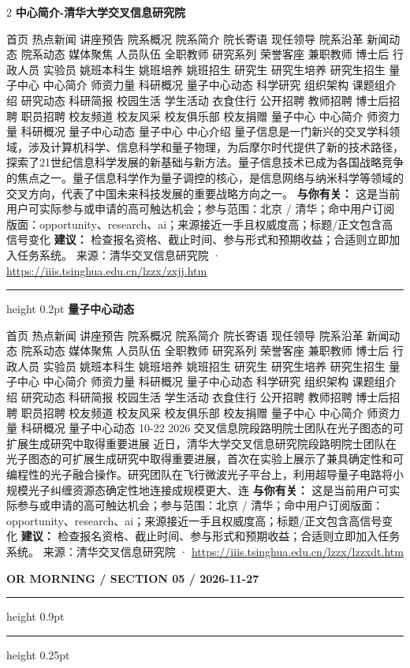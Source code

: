 \documentclass[10.5pt]{ctexart}
\begin{document}
\begin{multicols}{2}
{\large\bfseries 中心简介-清华大学交叉信息研究院}\par
首页 热点新闻 讲座预告 院系概况 院系简介 院长寄语 现任领导 院系沿革 新闻动态 院系动态 媒体聚焦 人员队伍 全职教师 研究系列 荣誉客座 兼职教师 博士后 行政人员 实验员 姚班本科生 姚班培养 姚班招生 研究生 研究生培养 研究生招生 量子中心 中心简介 师资力量 科研概况 量子中心动态 科学研究 组织架构 课题组介绍 研究动态 科研简报 校园生活 学生活动 衣食住行 公开招聘 教师招聘 博士后招聘 职员招聘 校友频道 校友风采 校友俱乐部 校友捐赠 量子中心 中心简介 师资力量 科研概况 量子中心动态 量子中心 中心介绍 量子信息是一门新兴的交叉学科领域，涉及计算机科学、信息科学和量子物理，为后摩尔时代提供了新的技术路径，探索了21世纪信息科学发展的新基础与新方法。量子信息技术已成为各国战略竞争的焦点之一。量子信息科学作为量子调控的核心，是信息网络与纳米科学等领域的交叉方向，代表了中国未来科技发展的重要战略方向之一。
\textbf{与你有关：} 这是当前用户可实际参与或申请的高可触达机会；参与范围：北京 / 清华；命中用户订阅版面：opportunity、research、ai；来源接近一手且权威度高；标题/正文包含高信号变化
\textbf{建议：} 检查报名资格、截止时间、参与形式和预期收益；合适则立即加入任务系统。
{\footnotesize\color{ormuted} 来源：清华交叉信息研究院 · \url{https://iiis.tsinghua.edu.cn/lzzx/zxjj.htm}}
\vspace{2mm}
\hrule height 0.2pt
\vspace{2mm}
{\large\bfseries 量子中心动态}\par
首页 热点新闻 讲座预告 院系概况 院系简介 院长寄语 现任领导 院系沿革 新闻动态 院系动态 媒体聚焦 人员队伍 全职教师 研究系列 荣誉客座 兼职教师 博士后 行政人员 实验员 姚班本科生 姚班培养 姚班招生 研究生 研究生培养 研究生招生 量子中心 中心简介 师资力量 科研概况 量子中心动态 科学研究 组织架构 课题组介绍 研究动态 科研简报 校园生活 学生活动 衣食住行 公开招聘 教师招聘 博士后招聘 职员招聘 校友频道 校友风采 校友俱乐部 校友捐赠 量子中心 中心简介 师资力量 科研概况 量子中心动态 10-22 2026 交叉信息院段路明院士团队在光子图态的可扩展生成研究中取得重要进展 近日，清华大学交叉信息研究院段路明院士团队在光子图态的可扩展生成研究中取得重要进展，首次在实验上展示了兼具确定性和可编程性的光子融合操作。研究团队在飞行微波光子平台上，利用超导量子电路将小规模光子纠缠资源态确定性地连接成规模更大、连
\textbf{与你有关：} 这是当前用户可实际参与或申请的高可触达机会；参与范围：北京 / 清华；命中用户订阅版面：opportunity、research、ai；来源接近一手且权威度高；标题/正文包含高信号变化
\textbf{建议：} 检查报名资格、截止时间、参与形式和预期收益；合适则立即加入任务系统。
{\footnotesize\color{ormuted} 来源：清华交叉信息研究院 · \url{https://iiis.tsinghua.edu.cn/lzzx/lzzxdt.htm}}
\end{multicols}
\newpage
{\small\bfseries OR MORNING / SECTION 05 / 2026-11-27}
\vspace{2mm}
\hrule height 0.9pt
\vspace{1.5mm}
\hrule height 0.25pt
\vspace{4mm}
\end{document}
